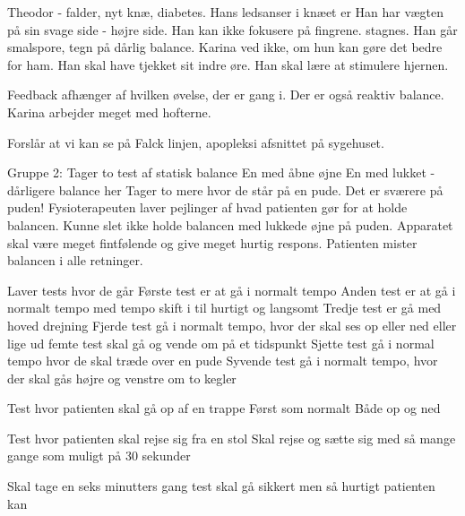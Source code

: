 Theodor - falder, nyt knæ, diabetes.
Hans ledsanser i knæet er
Han har vægten på sin svage side - højre side.
Han kan ikke fokusere på fingrene.  stagnes. 
Han går smalspore, tegn på dårlig balance. Karina ved ikke, om hun kan gøre det bedre for ham. Han skal have tjekket sit indre øre. Han skal lære at stimulere hjernen. 

Feedback afhænger af hvilken øvelse, der er gang i. Der er også reaktiv balance. Karina arbejder meget med hofterne. 

Forslår at vi kan se på Falck linjen, apopleksi afsnittet på sygehuset.

Gruppe 2:
Tager to test af statisk balance
En med åbne øjne 
En med lukket - dårligere balance her
Tager to mere hvor de står på en pude.
Det er sværere på puden!
Fysioterapeuten laver pejlinger af hvad patienten gør for at holde balancen.
Kunne slet ikke holde balancen med lukkede øjne på puden.
Apparatet skal være meget fintfølende og give meget hurtig respons.
Patienten mister balancen i alle retninger.

Laver tests hvor de går
Første test er at gå i normalt tempo
Anden test er at gå i normalt tempo med tempo skift i til hurtigt og langsomt
Tredje test er gå med hoved drejning 
Fjerde test gå i normalt tempo, hvor der skal ses op eller ned eller lige ud
femte test skal gå og vende om på et tidspunkt 
Sjette test gå i normal tempo hvor de skal træde over en pude
Syvende test gå i normalt tempo, hvor der skal gås højre og venstre om to kegler

Test hvor patienten skal gå op af en trappe
Først som normalt
Både op og ned

Test hvor patienten skal rejse sig fra en stol
Skal rejse og sætte sig med så mange gange som muligt på 30 sekunder 

Skal tage en seks minutters gang test skal gå sikkert men så hurtigt patienten kan
